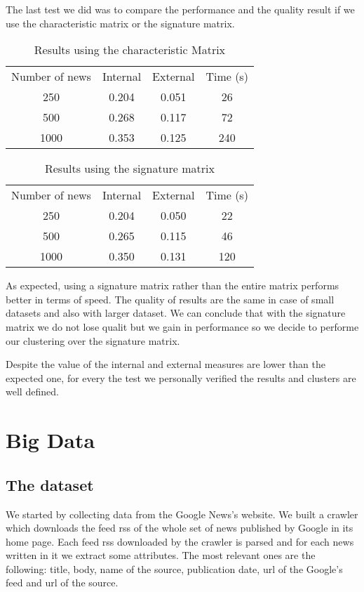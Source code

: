 \documentclass{acm_proc_article-sp}
\begin{document}

The last test we did was to compare the performance and the quality result if we use the characteristic matrix or the signature matrix.

\begin{table}[!h]
\centering
\label{table:matrix}
\begin{tabular}{cccc}
Number of news & Internal & External & Time (s) \\
250            & 0.204    & 0.051    & 26       \\
500            & 0.268    & 0.117    & 72       \\
1000           & 0.353    & 0.125    & 240      \\
\end{tabular}
\caption{Results using the characteristic Matrix}
\end{table}

\begin{table}[!h]
\centering
\label{table:sigmatrix}
\begin{tabular}{cccc}
Number of news & Internal & External & Time (s) \\
250            & 0.204    & 0.050    & 22       \\
500            & 0.265    & 0.115    & 46       \\
1000           & 0.350    & 0.131    & 120 
\end{tabular}
\caption{Results using the signature matrix}
\end{table}

As expected, using a signature matrix rather than the entire matrix performs better in terms of speed.
The quality of results are the same in case of small datasets and also with larger dataset. We can conclude that with the signature matrix we do not lose qualit but we gain in performance so we decide to performe our clustering over the signature matrix.


Despite the value of the internal and external measures are lower than the expected one, for every the test we personally verified the results and clusters are well defined.

\section{Big Data}
\vspace{2mm}

\subsection{The dataset}
\vspace{2mm}
We started by collecting data from the Google News's website. We built a crawler which downloads the feed rss of the whole set of news published by Google in its home page.
Each feed rss downloaded by the crawler is parsed and for each news written in it we extract some attributes. The most relevant ones are the following: title, body, name of the source, publication date, url of the Google's feed and url of the source.
\end{document}
